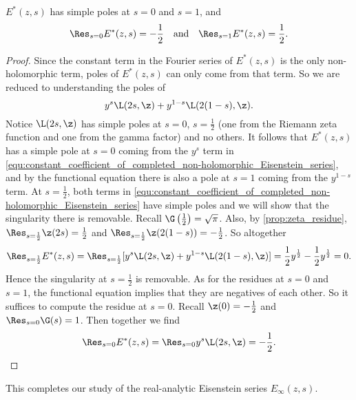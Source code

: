       \begin{proposition}\label{equ:completed_real-analytic_Eisenstein_series_residues}
        $E^{\ast}(z,s)$ has simple poles at $s = 0$ and $s = 1$, and
        \[
          \Res_{s = 0}E^{\ast}(z,s) = -\frac{1}{2} \quad \text{and} \quad \Res_{s = 1}E^{\ast}(z,s) = \frac{1}{2}.
        \]
      \end{proposition}
      \begin{proof}
        Since the constant term in the Fourier series of $E^{\ast}(z,s)$ is the only non-holomorphic term, poles of $E^{\ast}(z,s)$ can only come from that term. So we are reduced to understanding the poles of
        \begin{equation}\label{equ:constant_coefficient_of_completed_non-holomorphic_Eisenstein_series}
          y^{s}\L(2s,\z)+y^{1-s}\L(2(1-s),\z).
        \end{equation}
        Notice $\L(2s,\z)$ has simple poles at $s = 0$, $s = \frac{1}{2}$ (one from the Riemann zeta function and one from the gamma factor) and no others. It follows that $E^{\ast}(z,s)$ has a simple pole at $s = 0$ coming from the $y^{s}$ term in
        \cref{equ:constant_coefficient_of_completed_non-holomorphic_Eisenstein_series}, and by the functional equation there is also a pole at $s = 1$ coming from the $y^{1-s}$ term. At $s = \frac{1}{2}$, both terms in \cref{equ:constant_coefficient_of_completed_non-holomorphic_Eisenstein_series} have simple poles and we will show that the singularity there is removable. Recall $\G\left(\frac{1}{2}\right) = \sqrt{\pi}$. Also, by \cref{prop:zeta_residue}, $\Res_{s = \frac{1}{2}}\z(2s) = \frac{1}{2}$ and $\Res_{s = \frac{1}{2}}\z(2(1-s)) = -\frac{1}{2}$. So altogether
        \[
          \Res_{s = \frac{1}{2}}E^{\ast}(z,s) = \Res_{s = \frac{1}{2}}[y^{s}\L(2s,\z)+y^{1-s}\L(2(1-s),\z)] = \frac{1}{2}y^{\frac{1}{2}}-\frac{1}{2}y^{\frac{1}{2}} = 0.
        \]
        Hence the singularity at $s = \frac{1}{2}$ is removable. As for the residues at $s = 0$ and $s = 1$, the functional equation implies that they are negatives of each other. So it suffices to compute the residue at $s = 0$. Recall $\z(0) = -\frac{1}{2}$ and $\Res_{s = 0}\G(s) = 1$. Then together we find
        \[
          \Res_{s = 0}E^{\ast}(z,s) = \Res_{s = 0}y^{s}\L(2s,\z) = -\frac{1}{2}.
        \]
      \end{proof}

      This completes our study of the real-analytic Eisenstein series $E_{\infty}(z,s)$.
